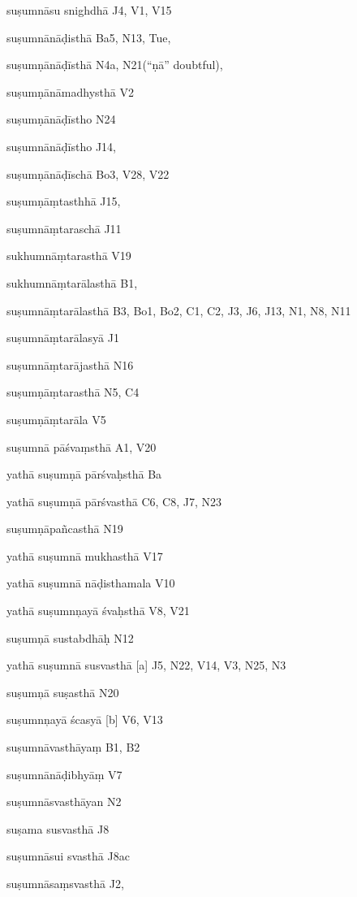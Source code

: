 \begin{ekdosis}
\begin{marma}[hp01_055]
\begin{marma}[hp02_006]
\item[suṣumnāsu snighdhā] J4, V1, V15
\item[suṣumnānāḍisthā] Ba5, N13, Tue, 
\item[suṣumṇānāḍīsthā] N4a, N21(“ṇā” doubtful), 
\item[suṣumṇānāmadhysthā] V2
\item[suṣumṇānāḍīstho] N24
\item[suṣumnānāḍīstho] J14,
\item[suṣumṇānāḍīschā] Bo3, V28, V22
\item[suṣumṇāṃtasthhā] J15,
\item[suṣumnāṃtaraschā] J11
\item[sukhumnāṃtarasthā] V19
\item[sukhumnāṃtarālasthā] B1,
\item[suṣumnāṃtarālasthā] B3, Bo1, Bo2, C1, C2, J3, J6, J13, N1, N8, N11
\item[suṣumnāṃtarālasyā] J1
\item[suṣumnāṃtarājasthā] N16
\item[suṣumṇāṃtarasthā]  N5, C4
\item[suṣumṇāṃtarāla] V5
\item[suṣumnā pāśvaṃsthā] A1, V20
\item[yathā suṣumṇā pārśvaḥsthā] Ba
\item[yathā suṣumṇā pārśvasthā] C6, C8, J7, N23
\item[suṣumṇāpañcasthā] N19
\item[yathā suṣumnā mukhasthā] V17
\item[yathā suṣumnā nāḍisthamala] V10
\item[yathā suṣumnņayā śvaḥsthā] V8, V21
\item[suṣumņā sustabdhāḥ] N12
\item[yathā suṣumnā susvasthā][a] J5, N22, V14, V3, N25, N3
\item[suṣumņā suṣasthā] N20
\item[suṣumnņayā ścasyā][b] V6, V13
\item[suṣumnāvasthāyaṃ] B1, B2
\item[suṣumnānāḍibhyāṃ] V7
\item[suṣumnāsvasthāyan] N2
\item[suṣama susvasthā] J8
\item[suṣumnāsui svasthā] J8ac %
\item[suṣumnāsaṃsvasthā] J2,

\end{marma}
\end{marma}
\end{ekdosis}

